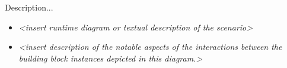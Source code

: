 Description...

\begin{itemize}
\item
  \emph{\textless insert runtime diagram or textual description of the
  scenario\textgreater{}}
\item
  \emph{\textless insert description of the notable aspects of the
  interactions between the building block instances depicted in this
  diagram.\textgreater{}}
\end{itemize}
